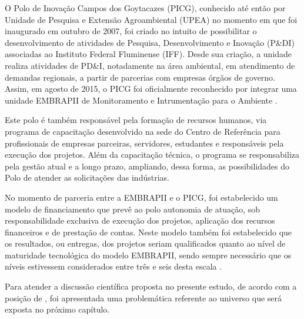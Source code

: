 O Polo de Inovação Campos dos Goytacazes (PICG), conhecido até então por Unidade de Pesquisa e Extensão Agroambiental (UPEA) no momento em que foi inaugurado em outubro de 2007, foi criado no intuito de possibilitar o desenvolvimento de atividades de Pesquisa, Desenvolvimento e Inovação (P\&DI) associadas ao Instituto Federal Fluminense (IFF). Desde sua criação, a unidade realiza atividades de PD\&I, notadamente na área ambiental, em atendimento de demandas regionais, a partir de parcerias com empresas  órgãos de governo. Assim, em agosto de 2015, o PICG foi oficialmente reconhecido por integrar uma unidade EMBRAPII de Monitoramento e Intrumentação para o Ambiente \cite{embrapiiff}.

Este polo é também responsável pela formação de recursos humanos, via programa de capacitação desenvolvido na sede do Centro de Referência para profissionais de empresas parceiras, servidores, estudantes e responsáveis pela execução dos projetos. Além da capacitação técnica, o programa se responsabiliza pela gestão atual e a longo prazo, ampliando, dessa forma, as possibilidades do Polo de atender as solicitações das indústrias.

No momento de parceria entre a EMBRAPII e o PICG, foi estabelecido um modelo de financiamento que prevê ao polo autonomia de atuação, sob responsabilidade exclusiva de execução dos projetos, aplicação dos recursos financeiros e de prestação de contas. Neste modelo também foi estabelecido que os resultados, ou entregas, dos projetos seriam qualificados quanto ao nível de maturidade tecnológica do modelo EMBRAPII, sendo sempre necessário que os níveis estivessem considerados entre três e seis desta escala \cite{iffembrapii2016}.

Para atender a discussão científica proposta no presente estudo, de acordo com a posição de , foi apresentada uma problemática referente ao universo que será exposta no próximo capítulo.

